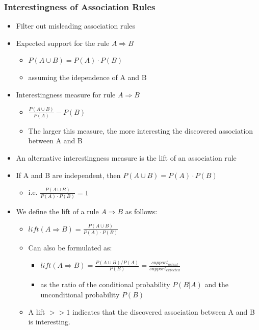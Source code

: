 \documentclass{article}
\begin{document}
\subsubsection{Interestingness of Association Rules}
\begin{itemize}
  \item Filter out misleading association rules
  \item Expected support for the rule $A \Rightarrow B$
    \begin{itemize}
      \item $P(A \cup B) = P(A) \cdot P(B)$
      \item assuming the idependence of A and B
    \end{itemize}
  \item Interestingness measure for rule $A \Rightarrow B$
    \begin{itemize}
      \item $\frac{P(A \cup B)}{P(A)} - P(B)$
      \item The larger this measure, the more interesting the discovered association between A and B
    \end{itemize}
  \item An alternative interestingness measure is the lift of an association rule
  \item If A and B are independent, then $P(A \cup B) = P(A) \cdot P(B)$
    \begin{itemize}
      \item i.e. $\frac{P(A \cup B)}{P(A) \cdot P(B)} = 1$
    \end{itemize}
  \item We define the lift of a rule $A \Rightarrow B$ as follows:
    \begin{itemize}
      \item $lift(A \Rightarrow B) = \frac{P(A \cup B)}{P(A) \cdot P(B)}$
      \item Can also be formulated as:
      \begin{itemize}
        \item $lift(A \Rightarrow B) = \frac{P(A \cup B) / P(A)}{P(B)} = \frac{support_{actual}}{support_{expected}}$
        \item as the ratio of the conditional probability $P(B|A)$ and the unconditional probability $P(B)$
      \end{itemize}
      \item A lift $>>1$ indicates that the discovered association between A and B is interesting.
    \end{itemize}  
\end{itemize}
\end{document}
